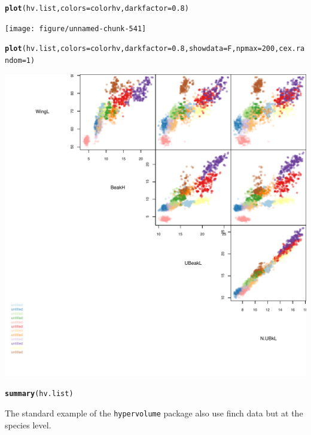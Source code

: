 \documentclass[12pt]{article}\usepackage[]{graphicx}\usepackage[]{color}
\makeatletter
\def\maxwidth{ %
  \ifdim\Gin@nat@width>\linewidth
    \linewidth
  \else
    \Gin@nat@width
  \fi
}
\newcommand{\hlnum}[1]{\textcolor[rgb]{0.686,0.059,0.569}{#1}}%
\newcommand{\hlstd}[1]{\textcolor[rgb]{0.345,0.345,0.345}{#1}}%
\newcommand{\hlkwc}[1]{\textcolor[rgb]{0.333,0.667,0.333}{#1}}%
\newcommand{\hlkwd}[1]{\textcolor[rgb]{0.737,0.353,0.396}{\textbf{#1}}}%
\newenvironment{kframe}{%
 \def\at@end@of@kframe{}%
 \ifinner\ifhmode%
  \def\at@end@of@kframe{\end{minipage}}%
  \begin{minipage}{\columnwidth}%
 \fi\fi%
 \def\FrameCommand##1{\hskip\@totalleftmargin \hskip-\fboxsep
 \colorbox{shadecolor}{##1}\hskip-\fboxsep
     \hskip-\linewidth \hskip-\@totalleftmargin \hskip\columnwidth}%
 \MakeFramed {\advance\hsize-\width
   \@totalleftmargin\z@ \linewidth\hsize
   \@setminipage}}%
 {\par\unskip\endMakeFramed%
 \at@end@of@kframe}
\newenvironment{knitrout}{}{} %
\makeatother
\begin{document}
\begin{knitrout}
\begin{kframe}
\begin{alltt}
\hlkwd{plot}\hlstd{(hv.list,} \hlkwc{colors} \hlstd{= colorhv,} \hlkwc{darkfactor} \hlstd{=} \hlnum{0.8}\hlstd{)}
\end{alltt}
\end{kframe}
\texttt{[image: figure/unnamed-chunk-541]} 
\begin{kframe}\begin{alltt}
\hlkwd{plot}\hlstd{(hv.list,} \hlkwc{colors} \hlstd{= colorhv,} \hlkwc{darkfactor} \hlstd{=} \hlnum{0.8}\hlstd{,} \hlkwc{showdata} \hlstd{= F,} \hlkwc{npmax} \hlstd{=} \hlnum{200}\hlstd{,} \hlkwc{cex.random} \hlstd{=} \hlnum{1}\hlstd{)}
\end{alltt}
\end{kframe}
\includegraphics[width=\maxwidth]{figure/unnamed-chunk-542} 

\end{knitrout}

\begin{knitrout}
\color{fgcolor}\begin{kframe}
\begin{alltt}
\hlkwd{summary}\hlstd{(hv.list)}
\end{alltt}
\end{kframe}
\end{knitrout}

The standard example of the \texttt{hypervolume} package also use finch data but at the species level.
\end{document}
